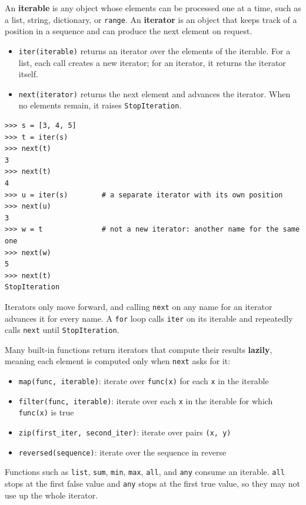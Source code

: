 An \textbf{iterable} is any object whose elements can be processed one at a time, such as a list, string, dictionary, or \lstinline{range}. An \textbf{iterator} is an object that keeps track of a position in a sequence and can produce the next element on request.
\begin{itemize}
    \item \lstinline{iter(iterable)} returns an iterator over the elements of the iterable. For a list, each call creates a new iterator; for an iterator, it returns the iterator itself.
    \item \lstinline{next(iterator)} returns the next element and advances the iterator. When no elements remain, it raises \lstinline{StopIteration}.
\end{itemize}
\begin{lstlisting}
>>> s = [3, 4, 5]
>>> t = iter(s)
>>> next(t)
3
>>> next(t)
4
>>> u = iter(s)        # a separate iterator with its own position
>>> next(u)
3
>>> w = t              # not a new iterator: another name for the same one
>>> next(w)
5
>>> next(t)
StopIteration
\end{lstlisting}
Iterators only move forward, and calling \lstinline{next} on any name for an iterator advances it for every name. A \lstinline{for} loop calls \lstinline{iter} on its iterable and repeatedly calls \lstinline{next} until \lstinline{StopIteration}.

Many built-in functions return iterators that compute their results \textbf{lazily}, meaning each element is computed only when \lstinline{next} asks for it:
\begin{itemize}
    \item \lstinline{map(func, iterable)}: iterate over \lstinline{func(x)} for each \lstinline{x} in the iterable
    \item \lstinline{filter(func, iterable)}: iterate over each \lstinline{x} in the iterable for which \lstinline{func(x)} is true
    \item \lstinline{zip(first_iter, second_iter)}: iterate over pairs \lstinline{(x, y)}
    \item \lstinline{reversed(sequence)}: iterate over the sequence in reverse
\end{itemize}
Functions such as \lstinline{list}, \lstinline{sum}, \lstinline{min}, \lstinline{max}, \lstinline{all}, and \lstinline{any} consume an iterable. \lstinline{all} stops at the first false value and \lstinline{any} stops at the first true value, so they may not use up the whole iterator.

